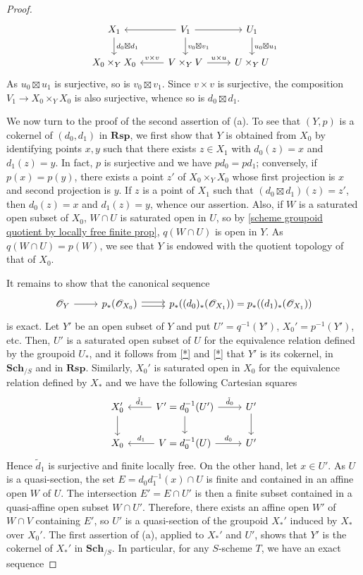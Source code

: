 \begin{proof}
\begin{equation}
\begin{tikzcd}
X_1\ar[d,"d_0\boxtimes d_1"]&V_1\ar[l]\ar[r]\ar[d,"v_0\boxtimes v_1"]&U_1\ar[d,"u_0\boxtimes u_1"]\\
X_0\times_YX_0&V\times_YV\ar[l,swap,"v\times v"]\ar[r,"u\times u"]&U\times_YU
\end{tikzcd}
\end{equation}
As $u_0\boxtimes u_1$ is surjective, so is $v_0\boxtimes v_1$. Since $v\times v$ is surjective, the composition $V_1\to X_0\times_YX_0$ is also surjective, whence so is $d_0\boxtimes d_1$.\par
We now turn to the proof of the second assertion of (a). To see that $(Y,p)$ is a cokernel of $(d_0,d_1)$ in $\mathbf{Rsp}$, we first show that $Y$ is obtained from $X_0$ by identifying points $x,y$ such that there exists $z\in X_1$ with $d_0(z)=x$ and $d_1(z)=y$. In fact, $p$ is surjective and we have $pd_0=pd_1$; conversely, if $p(x)=p(y)$, there exists a point $z'$ of $X_0\times_YX_0$ whose first projection is $x$ and second projection is $y$. If $z$ is a point of $X_1$ such that $(d_0\boxtimes d_1)(z)=z'$, then $d_0(z)=x$ and $d_1(z)=y$, whence our assertion. Also, if $W$ is a saturated open subset of $X_0$, $W\cap U$ is saturated open in $U$, so by \cref{scheme groupoid quotient by locally free finite prop}, $q(W\cap U)$ is open in $Y$. As $q(W\cap U)=p(W)$, we see that $Y$ is endowed with the quotient topology of that of $X_0$.\par
It remains to show that the canonical sequence 
\[\begin{tikzcd}
\mathscr{O}_Y\ar[r]&p_*(\mathscr{O}_{X_0})\ar[r,shift left=2pt]\ar[r,shift right=2pt,swap]&p_*((d_0)_*(\mathscr{O}_{X_1}))=p_*((d_1)_*(\mathscr{O}_{X_1}))
\end{tikzcd}\]
is exact. Let $Y'$ be an open subset of $Y$ and put $U'=q^{-1}(Y')$, $X_0'=p^{-1}(Y')$, etc. Then, $U'$ is a saturated open subset of $U$ for the equivalence relation defined by the groupoid $U_*$, and it follows from \cref{*} and \cref{*} that $Y'$ is its cokernel, in $\mathbf{Sch}_{/S}$ and in $\mathbf{Rsp}$. Similarly, $X_0'$ is saturated open in $X_0$ for the equivalence relation defined by $X_*$ and we have the following Cartesian squares
\[\begin{tikzcd}
X_0'\ar[d]&V'=d_0^{-1}(U')\ar[l,swap,"\tilde{d}_1"]\ar[r,"\tilde{d}_0"]\ar[d]&U'\ar[d]\\
X_0&V=d_0^{-1}(U)\ar[l,swap,"d_1"]\ar[r,"d_0"]&U'
\end{tikzcd}\]
Hence $\tilde{d}_1$ is surjective and finite locally free. On the other hand, let $x\in U'$. As $U$ is a quasi-section, the set $E=d_0d_1^{-1}(x)\cap U$ is finite and contained in an affine open $W$ of $U$. The intersection $E'=E\cap U'$ is then a finite subset contained in a quasi-affine open subset $W\cap U'$. Therefore, there exists an affine open $W'$ of $W\cap V$ containing $E'$, so $U'$ is a quasi-section of the groupoid $X_*'$ induced by $X_*$ over $X_0'$. The first assertion of (a), applied to $X_*'$ and $U'$, shows that $Y'$ is the cokernel of $X_*'$ in $\mathbf{Sch}_{/S}$. In particular, for any $S$-scheme $T$, we have an exact sequence

\end{proof}
